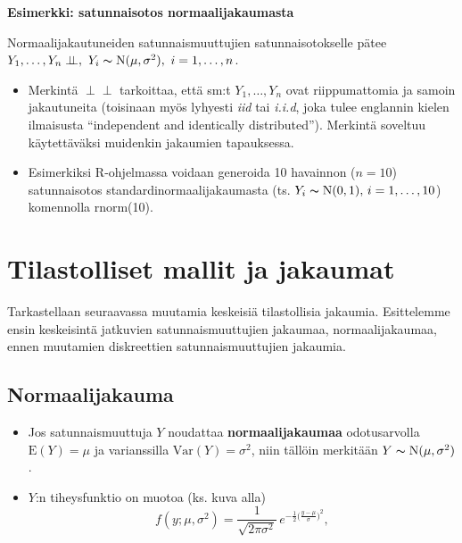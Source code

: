 \documentclass[
]{book}
\providecommand{\tightlist}{%
  \setlength{\itemsep}{0pt}\setlength{\parskip}{0pt}}
\begin{document}
\begin{eblock}{}

\textbf{Esimerkki: satunnaisotos normaalijakaumasta}

Normaalijakautuneiden satunnaismuuttujien satunnaisotokselle pätee \(Y_1, \ldots, Y_n \perp \!\!\! \perp, \,\, Y_i \thicksim \text{N}(\mu, \sigma^2),\,\, i=1,\ldots,n\).

\begin{itemize}
\tightlist
\item
  Merkintä \(\perp \!\!\! \perp\) tarkoittaa, että sm:t \(Y_1,\ldots,Y_n\) ovat riippumattomia ja samoin jakautuneita (toisinaan myös lyhyesti \emph{iid} tai \emph{i.i.d}, joka tulee englannin kielen ilmaisusta ``independent and identically distributed''). Merkintä soveltuu käytettäväksi muidenkin jakaumien tapauksessa.
\item
  Esimerkiksi R-ohjelmassa voidaan generoida 10 havainnon (\(n=10\)) satunnaisotos standardinormaalijakaumasta (ts. \(Y_i \thicksim \text{N}(0,1),\, i=1,\ldots,10\)) komennolla rnorm(10).
\end{itemize}

\end{eblock}

\newpage

\hypertarget{luku82}{%
\section{Tilastolliset mallit ja jakaumat}\label{luku82}}

Tarkastellaan seuraavassa muutamia keskeisiä tilastollisia jakaumia. Esittelemme ensin keskeisintä jatkuvien satunnaismuuttujien jakaumaa, normaalijakaumaa, ennen muutamien diskreettien satunnaismuuttujien jakaumia.

\hypertarget{normaalijakauma}{%
\subsection{Normaalijakauma}\label{normaalijakauma}}

\begin{itemize}
\item
  Jos satunnaismuuttuja \(Y\) noudattaa \textbf{normaalijakaumaa} odotusarvolla \(\text{E}(Y)= \mu\) ja varianssilla \(\mathrm{Var}(Y) = \sigma^2\), niin tällöin merkitään \(Y \thicksim \text{N}(\mu, \sigma^2)\).
\item
  \(Y\):n tiheysfunktio on muotoa (ks. kuva alla)
  \[
  f(y; \mu, \sigma^2) = \frac{1}{\sqrt{2 \pi \sigma^2}} \, e^{-\frac{1}{2} \Big(\frac{y- \mu}{\sigma} \Big)^2}, 
  \]
\end{itemize}
\end{document}
